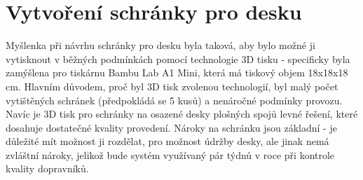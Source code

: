 %
%
%

\section{Vytvoření schránky pro desku}

Myšlenka při návrhu schránky pro desku byla taková, aby bylo možné ji vytisknout v běžných podmínkách pomocí technologie 3D tisku - specificky byla zamýšlena pro tiskárnu Bambu Lab A1 Mini, která má tiskový objem 18x18x18 cm. Hlavním důvodem, proč byl 3D tisk zvolenou technologií, byl malý počet vytištěných schránek (předpokládá se 5 kusů) a nenáročné podmínky provozu. Navíc je 3D tisk pro schránky na osazené desky plošných spojů levné řešení, které dosahuje dostatečné kvality provedení. Nároky na schránku jsou základní - je důležité mít možnost ji rozdělat, pro možnost údržby desky, ale jinak nemá zvláštní nároky, jelikož bude systém využívaný pár týdnů v roce při kontrole kvality dopravníků.

